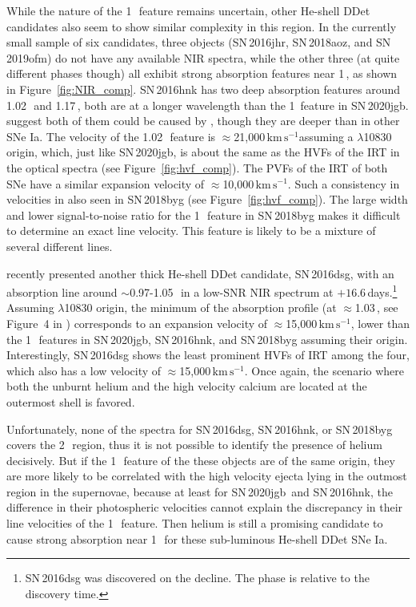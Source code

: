 \documentclass[twocolumn]{aastex631}
\newcommand{\sn}{SN\,2020jgb}
\newcommand{\kms}{$\mathrm{km}\,\mathrm{s}^{-1}$}
\begin{document}
While the nature of the 1\,\micron\ feature remains uncertain, other He-shell DDet candidates also seem to show similar complexity in this region. In the currently small sample of six candidates, three objects (SN\,2016jhr, SN\,2018aoz, and SN\,2019ofm) do not have any available NIR spectra, while the other three (at quite different phases though) all exhibit strong absorption features near 1\,\micron, as shown in Figure~\ref{fig:NIR_comp}. SN\,2016hnk has two deep absorption features around 1.02\,\micron\ and 1.17\,\micron, both are at a longer wavelength than the 1\micron\ feature in \sn. \citet{galbany_16hnk_2019} suggest both of them could be caused by , though they are deeper than in other SNe Ia. The velocity of the 1.02\,\micron\ feature is $\approx$21,000\,\kms assuming a  $\lambda$10830 origin, which, just like \sn, is about the same as the HVFs of the  IRT in the optical spectra (see Figure~\ref{fig:hvf_comp}). The PVFs of the  IRT of both SNe have a similar expansion velocity of $\approx$10,000\,\kms. Such a consistency in velocities in also seen in SN\,2018byg (see Figure~\ref{fig:hvf_comp}). The large width and lower signal-to-noise ratio for the 1\,\micron\ feature in SN\,2018byg makes it difficult to determine an exact line velocity. This feature is likely to be a mixture of several different lines. 

\citet{Dong_16dsg_2022} recently presented another thick He-shell DDet candidate, SN\,2016dsg, with an absorption line around $\sim$0.97-1.05\,\micron\ in a low-SNR NIR spectrum at $+16.6$\,days.\footnote{SN\,2016dsg was discovered on the decline. The phase is relative to the discovery time.} Assuming  $\lambda$10830 origin, the minimum of the absorption profile (at $\approx$1.03\,\micron, see Figure~4 in \citealp{Dong_16dsg_2022}) corresponds to an expansion velocity of $\approx$15,000\,\kms, lower than the 1\,\micron\ features in \sn, SN\,2016hnk, and SN\,2018byg assuming their  origin. Interestingly, SN\,2016dsg shows the least prominent HVFs of  IRT among the four, which also has a low velocity of $\approx$15,000\,\kms. Once again, the scenario where both the unburnt helium and the high velocity calcium are located at the outermost shell is favored.

Unfortunately, none of the spectra for SN\,2016dsg, SN\,2016hnk, or SN\,2018byg covers the 2\,\micron\ region, thus it is not possible to identify the presence of helium decisively. But if the 1\,\micron\ feature of the these objects are of the same origin, they are more likely to be correlated with the high velocity ejecta lying in the outmost region in the supernovae, because at least for \sn\ and SN\,2016hnk, the difference in their photospheric velocities cannot explain the discrepancy in their line velocities of the 1\,\micron\ feature. Then helium is still a promising candidate to cause strong absorption near 1\,\micron\ for these sub-luminous He-shell DDet SNe Ia. 
\end{document}
